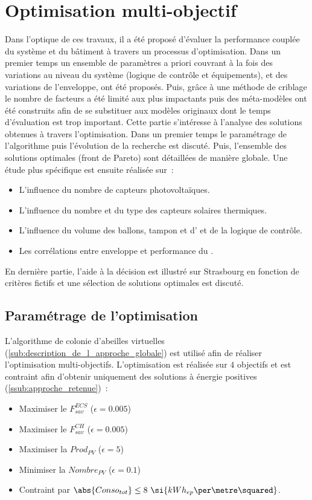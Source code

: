 \section{Optimisation multi-objectif} %
\label{sec:optimisation_multi_objectif}
Dans l’optique de ces travaux, il a été proposé d’évaluer la performance couplée
du système et du bâtiment à travers un processus d’optimisation. Dans un premier temps
un ensemble de paramètres a priori couvrant à la fois des variations
au niveau du système (logique de contrôle et équipements), et des variations de l’enveloppe,
ont été proposés. Puis, grâce à une méthode de criblage le nombre de facteurs a été limité
aux plus impactants puis des méta-modèles ont été construits afin de se substituer
aux modèles originaux dont le temps d’évaluation est trop important.
Cette partie s’intéresse à l’analyse des solutions obtenues à travers l’optimisation.
Dans un premier temps le paramétrage de l’algorithme puis l’évolution de la recherche est discuté.
Puis, l’ensemble des solutions optimales (front de Pareto) sont détaillées de manière globale. Une étude
plus spécifique est ensuite réalisée sur~:
\begin{itemize}
  \item L’influence du nombre de capteurs photovoltaïques.
  \item L’influence du nombre et du type des capteurs solaires thermiques.
  \item L’influence du volume des ballons, tampon et d’ et de la logique de contrôle.
  \item Les corrélations entre enveloppe et performance du .
\end{itemize}
En dernière partie, l’aide à la décision est illustré sur Strasbourg en fonction
de critères fictifs et une sélection de solutions optimales est discuté.



\subsection{Paramétrage de l’optimisation} %
\label{sub:parametrage_de_l_optimisation}
L’algorithme de colonie d’abeilles virtuelles (\ref{sub:description_de_l_approche_globale})
est utilisé afin de réaliser l’optimisation multi-objectifs. L’optimisation est réalisée
sur $4$ objectifs et est contraint afin d’obtenir uniquement des solutions à énergie
positives (\ref{ssub:approche_retenue})~:
\begin{itemize}
  \item Maximiser le $F_{sav}^{ECS}$ ($\epsilon = 0.005$)
  \item Maximiser le $F_{sav}^{CH}$ ($\epsilon = 0.005$)
  \item Maximiser la $Prod_{PV}$ ($\epsilon = 5$)
  \item Minimiser la $Nombre_{PV}$ ($\epsilon = 0.1$)
  \item Contraint par $\abs{Conso_{tot}}   \leq  8 \ \si{kWh_{ep}\per\metre\squared}$.
\end{itemize}

